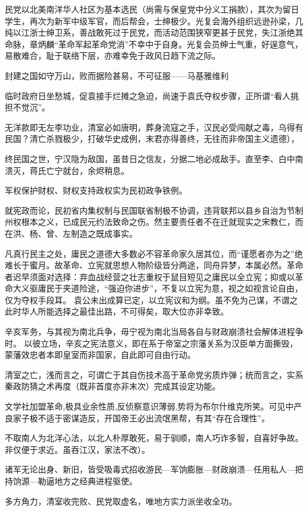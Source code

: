 民党以北美南洋华人社区为基本选民（尚需与保皇党中分义工捐款），其次为留日学生，再次为新军中级军官，而后帮会，士绅极少。光复会海外组织远逊孙梁，几纯以江浙士绅卫系，善战敢死过于民党，而活动范围狭窄更甚于民党，失江浙绝其命脉，章炳麟“革命军起革命党消”不幸中于自身。光复会员绅士气重，好逞意气，易散难合，耻于联络下层，亦难幸免于政风日趋下流之际。

封建之国如守万山，败而据险甚易，不可征服——马基雅维利

临时政府日坐愁城，促袁接手烂摊之急迫，尚速于袁氏夺权步骤，正所谓“看人挑担不觉沉”。

无洋款即无左李功业，清室必如唐明，葬身流寇之手，汉民必受闯献之毒，乌得有民国？清亡杀戮极少，打破华史成例，末君亦得善终，无往而非帝国主义遗德），

终民国之世，宁汉隐为敌国，虽昔日之信友，分据二地必成敌手。直至李、白中南溃灭，蒋氏亡宁就台，余烬稍息。

军权保护财权、财权支持政权实为民初政争铁例。

就宪政而论，民初省内集权制与民国联省制极不协调，违背联邦以县乡自治为节制州权根本之义，已成民元约法致命之伤。然主要责任者不在迁就现实之宋教仁，而在洪、杨、曾、左制造之既成事实。

凡真行民主之处，庸民之道德大多数必不容革命家久居其位，而“谨愿者亦为之”绝难长于蜜月。故革命、立宪就思想人物阶级皆分两途，同舟异梦，本属必然。革命者迟早须面对选择：弃血战经营之壮志重权于鼠目短见之庸民以全立宪；抑或以革命大义驱庸民于夹道险途，“强迫你进步”，不复以立宪为意，视之如视言论自由，仅为夺权手段耳。
袁公未出成算已定，以立宪议和为纲。虽不免为己谋，不谓之此时华人所能选择之最佳出路，不可得矣，取大位亦非幸致。

辛亥军务，与其视为南北兵争，毋宁视为南北当局各自与财政崩溃社会解体进程争时。
以彼立场，辛亥之宪法意义，即在系于帝室之宗藩关系为汉臣单方面撕毁，蒙藩效忠者本即皇室而非国家，自此即可自由行动。

清室之亡，浅而言之，可谓亡于其自伤技术高于革命党劣质炸弹；统而言之，实系秦政防猜之术再度（既非首度亦非末次）完成其设定功能。

文学社加盟革命,极具业余性质,反侦察意识薄弱,势将为布尔什维克所笑。可见中产良家子极不适于密谋造反，开国帝王必出流氓黑帮，有其“存在合理性”。

不取南人为北洋心法，以北人朴厚敢死，易于驯顺，南人巧诈多智，自喜好争故。非仅便于求近。虽吞江汉，家法不改）。

诸军无论出身、新旧，皆受吸毒式招收游民—军饷膨胀—财政崩溃—任用私人—把持饷源—勒逼地方之经典进程驱使。

多方角力，清室收完败、民党取虚名，唯地方实力派坐收全功。

